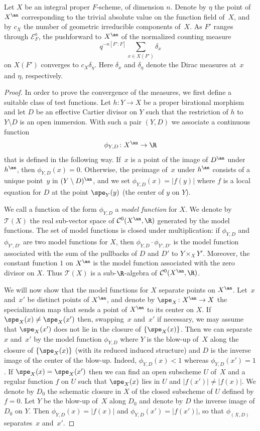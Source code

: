 \begin{prop}\label{prop:langweil}
Let $X$ be an integral proper $F$-scheme, of dimension $n$.
Denote by $\eta$ the point of $X^{\an}$ corresponding to the trivial absolute value on the function field of~$X$, and by $c_X$ the number of geometric irreducible components of~$X$.
As $F'$ ranges through $\mathcal{E}_F^a$, the pushforward to $X^{\an}$ of the normalized counting measure
\[
q^{-n[F'\colon F]}\sum_{x\in X(F')}\delta_x
\]
on $X(F')$
converges to $c_X\delta_{\eta}$. Here
$\delta_x$ and $\delta_\eta$ denote the Dirac measures at~$x$ and $\eta$, respectively.
\end{prop}
\begin{proof}
In order to prove the convergence of the measures, we first define a suitable class of test functions. Let $h\colon Y\to X$ be a proper birational morphism and let $D$ be an effective Cartier divisor on $Y$ such that the restriction of $h$ to $Y\setminus D$ is an open immersion. With such a pair $(Y,D)$ we associate a continuous function
\[
\phi_{Y,D}\colon X^{\an}\to \R
\]
that is defined in the following way.
If~$x$ is a point of the image of $D^{\an}$ under $h^{\an}$, then $\phi_{Y,D}(x)=0$.
Otherwise, the preimage of~$x$ under $h^{\an}$ consists of a unique point~$y$ in $(Y\setminus D)^{\an}$, and we set $\phi_{Y,D}(x)=|f(y)|$ where $f$ is a local equation for $D$ at the point $\spe_{Y}(y)$ (the center of $y$ on $Y$).

We call a function of the form $\phi_{Y,D}$ a {\em model function} for $X$.
We denote by $\mathcal{T}(X)$ the real sub-vector space of $\mathcal{C}^0(X^{\an},\R)$ generated by the model functions.
The set of model functions is closed under multiplication: if $\phi_{Y,D}$ and $\phi_{Y',D'}$ are two model functions for $X$, then $\phi_{Y,D}\cdot \phi_{Y',D'}$ is the model function associated with the sum of the pullbacks of $D$ and $D'$ to $Y\times_X Y'$.
Moreover, the constant function $1$ on $X^{\an}$ is the model function associated with the zero divisor on $X$.
Thus $\mathcal{T}(X)$ is a sub-$\R$-algebra of $\mathcal{C}^0(X^{\an},\R)$.

We will now show that the model functions for $X$ separate points on $X^{\an}$. Let~$x$ and~$x'$ be distinct points of $X^{\an}$, and denote by $\spe_X\colon X^{\an}\to X$ the specialization map that sends a point of $X^{\an}$ to its center on $X$.
If $\spe_X(x)\neq \spe_X(x')$ then, swapping~$x$ and~$x'$ if necessary, we may assume that
$\spe_X(x')$ does not lie in the closure of $\{\spe_X(x)\}$.
Then we can separate~$x$ and~$x'$ by the model function $\phi_{Y,D}$ where $Y$ is the blow-up of~$X$ along the closure of $\{\spe_X(x)\}$ (with its reduced induced structure) and $D$ is the inverse image of the center of the blow-up. Indeed, $\phi_{Y,D}(x)<1$ whereas $\phi_{Y,D}(x')=1$. If $\spe_X(x)= \spe_X(x')$ then we can find an open subscheme $U$ of~$X$ and a regular function $f$ on $U$ such that $\spe_X(x)$ lies in $U$ and
$|f(x')|\neq |f(x)|$. We denote by $D_0$ the schematic closure in $X$ of the closed subscheme of $U$ defined by $f=0$. Let $Y$ be the blow-up of~$X$ along $D_0$ and denote by $D$ the inverse image of $D_0$ on $Y$. Then $\phi_{Y,D}(x)=|f(x)|$ and $\phi_{Y,D}(x')=|f(x')|$, so that $\phi_{(X,D)}$ separates~$x$ and~$x'$.


\end{proof}
